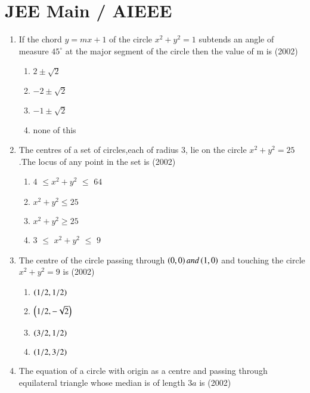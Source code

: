 \documentclass[journal,12pt,twocolumn]{IEEEtran}
\theoremstyle{remark}
\begin{document}
\section{JEE Main / AIEEE}
\begin{enumerate} 
\item If the chord $y=mx+1$ of the circle $x^2+y^2=1$ subtends an angle of measure \( 45^\circ \) at the major segment of the circle then the value of m is \hfill(2002)\\
\begin{enumerate}
\item$2\pm\sqrt{2}$\\
\item$-2\pm\sqrt{2}$\\
\item$-1\pm\sqrt{2}$\\
\item none of this\\
\end{enumerate}
\item The centres of a set of circles,each of radius $3$, lie on the circle $x^2+y^2=25$.The locus of any point in the set is \hfill(2002)\\
\begin{enumerate}
\item$4$ $\leq$$x^2+y^2$ $\leq$ $64$\\
\item$x^2+y^2\leq25$\\
\item$x^2+y^2\geq25$\\
\item$3$ $\leq$ $x^2+y^2$ $\leq$ $9$\\
\end{enumerate}
\item The centre of the circle passing through $\left(0,0\right) and \left(1,0\right)$ and touching the circle $x^2+y^2=9$ is \hfill(2002)\\
\begin{enumerate}
\item$\left(1/2,1/2\right)$\\
\item$\left(1/2,-\sqrt{2}\right)$\\
\item$\left(3/2,1/2\right)$\\
\item$\left(1/2,3/2\right)$\\
\end{enumerate}
\item The equation of a circle with origin as a centre and passing through equilateral triangle whose median is of length $3a$ is \hfill(2002)\\

\end{enumerate}
\end{document}
